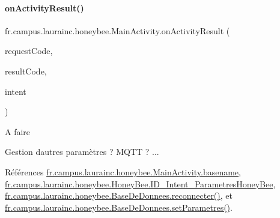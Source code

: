 \paragraph{\texorpdfstring{on\+Activity\+Result()}{onActivityResult()}}
{\footnotesize\ttfamily fr.\+campus.\+laurainc.\+honeybee.\+Main\+Activity.\+on\+Activity\+Result (\begin{DoxyParamCaption}\item[{int}]{request\+Code,  }\item[{int}]{result\+Code,  }\item[{Intent}]{intent }\end{DoxyParamCaption})\hspace{0.3cm}{\ttfamily [protected]}}

\begin{DoxyRefDesc}{A faire}
\item[\hyperlink{todo__todo000003}{A faire}]Gestion d\textquotesingle{}autres paramètres ? M\+Q\+TT ? ... \end{DoxyRefDesc}


Références \hyperlink{classfr_1_1campus_1_1laurainc_1_1honeybee_1_1_main_activity_a14d932c5d8ba352ebd01cc984110adf3}{fr.\+campus.\+laurainc.\+honeybee.\+Main\+Activity.\+basename}, \hyperlink{classfr_1_1campus_1_1laurainc_1_1honeybee_1_1_honey_bee_a479c42ac63c5c79e26c4836f965171d2}{fr.\+campus.\+laurainc.\+honeybee.\+Honey\+Bee.\+I\+D\+\_\+\+Intent\+\_\+\+Parametres\+Honey\+Bee}, \hyperlink{classfr_1_1campus_1_1laurainc_1_1honeybee_1_1_base_de_donnees_a89357a1cc8a3648400df37a8bfe95958}{fr.\+campus.\+laurainc.\+honeybee.\+Base\+De\+Donnees.\+reconnecter()}, et \hyperlink{classfr_1_1campus_1_1laurainc_1_1honeybee_1_1_base_de_donnees_a0960cb9d71647e80e195a580f90cd0d6}{fr.\+campus.\+laurainc.\+honeybee.\+Base\+De\+Donnees.\+set\+Parametres()}.


